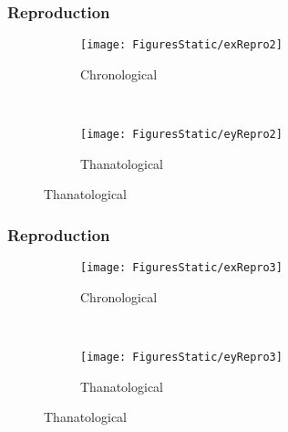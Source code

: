 \documentclass{beamer}
\begin{document}
\begin{frame}
\frametitle{Reproduction}
\vspace{-5em}
\begin{figure}
        \centering
        \begin{subfigure}[b]{0.5\textwidth}
                \centering
                \caption*{Chronological}
                \texttt{[image: FiguresStatic/exRepro2]}
        \end{subfigure}%
        ~ %
        \begin{subfigure}[b]{0.5\textwidth}
                \centering
                \caption*{Thanatological}
                \texttt{[image: FiguresStatic/eyRepro2]}
        \end{subfigure}
\end{figure}
\end{frame}


\begin{frame}
\frametitle{Reproduction}
\vspace{-5em}
\begin{figure}
        \centering
        \begin{subfigure}[b]{0.5\textwidth}
                \centering
                \caption*{Chronological}
                \texttt{[image: FiguresStatic/exRepro3]}
        \end{subfigure}%
        ~ %
        \begin{subfigure}[b]{0.5\textwidth}
                \centering
                \caption*{Thanatological}
                \texttt{[image: FiguresStatic/eyRepro3]}
        \end{subfigure}
\end{figure}
\end{frame}

\end{document}
